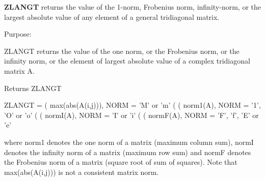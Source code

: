 {\bfseries Z\+L\+A\+N\+G\+T} returns the value of the 1-\/norm, Frobenius norm, infinity-\/norm, or the largest absolute value of any element of a general tridiagonal matrix. 

 \begin{DoxyParagraph}{Purpose\+: }
\begin{DoxyVerb} ZLANGT  returns the value of the one norm,  or the Frobenius norm, or
 the  infinity norm,  or the  element of  largest absolute value  of a
 complex tridiagonal matrix A.\end{DoxyVerb}

\end{DoxyParagraph}
\begin{DoxyReturn}{Returns}
Z\+L\+A\+N\+G\+T \begin{DoxyVerb}    ZLANGT = ( max(abs(A(i,j))), NORM = 'M' or 'm'
             (
             ( norm1(A),         NORM = '1', 'O' or 'o'
             (
             ( normI(A),         NORM = 'I' or 'i'
             (
             ( normF(A),         NORM = 'F', 'f', 'E' or 'e'

 where  norm1  denotes the  one norm of a matrix (maximum column sum),
 normI  denotes the  infinity norm  of a matrix  (maximum row sum) and
 normF  denotes the  Frobenius norm of a matrix (square root of sum of
 squares).  Note that  max(abs(A(i,j)))  is not a consistent matrix norm.\end{DoxyVerb}
 
\end{DoxyReturn}

